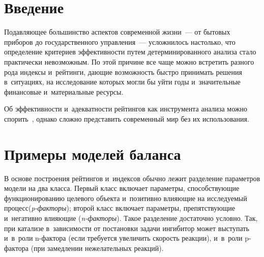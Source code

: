   



\thispagestyle{headings}

\begin{multicols}{2}

\label{st\stat}


\section{Введение}

\vspace*{-17pt}

Подавляющее большинство аспектов современной жизни~--- 
от бытовых приборов до государственного управ\-ле\-ния~--- усложнилось настолько, 
что определение критериев эффективности путем детерминированного анализа 
стало практически невозможным. По этой причине все чаще можно встретить 
разного рода индексы и~рейтинги, дающие возможность быст\-ро принимать 
решения в~ситуациях, на исследование которых могли бы уйти годы и~значительные 
финансовые и~материальные ресурсы. 

Об эффективности и~адекватности рейтингов 
как инструмента анализа можно спорить~\cite{Yurasova2017}, однако сложно 
представить современный мир без их использования.


\section{Примеры моделей баланса}

\vspace*{-17pt}

В основе построения рейтингов и~индексов обычно лежит разделение параметров 
модели на два класса. 
Первый класс включает па\-ра\-мет\-ры, способствующие 
функционированию целевого объекта и~позитивно влияющие на исследуемый 
процесс\linebreak (\textit{p-фак\-то\-ры}); второй класс включает параметры, препятствующие 
и~негативно влияющие ({\it n-фак\-то\-ры}). Такое разделение достаточно условно.
 Так, при катализе в~зависимости от постановки задачи ингибитор может выступать 
 и~в~роли n-фак\-то\-ра (если требуется увеличить ско\-рость реакции), 
 и~в~роли \mbox{p-фак}\-то\-ра (при замедлении нежелательных реакций).


\end{multicols}
